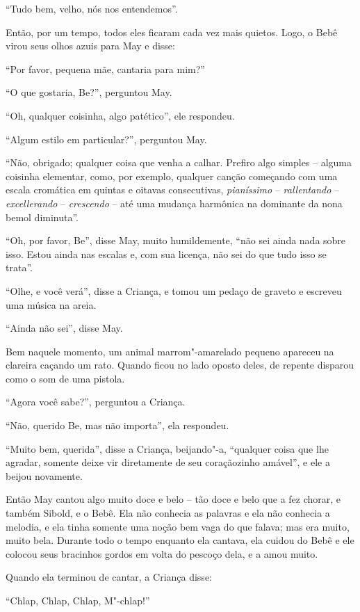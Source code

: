 ``Tudo bem, velho, nós nos entendemos''.

Então, por um tempo, todos eles ficaram cada vez mais quietos. Logo, o
Bebê virou seus olhos azuis para May e disse:

``Por favor, pequena mãe, cantaria para mim?''

``O que gostaria, Be?'', perguntou May.

``Oh, qualquer coisinha, algo patético'', ele respondeu.

``Algum estilo em particular?'', perguntou May.

``Não, obrigado; qualquer coisa que venha a calhar. Prefiro algo simples
-- alguma coisinha elementar, como, por exemplo, qualquer canção
começando com uma escala cromática em quintas e oitavas consecutivas,
\emph{pianíssimo} -- \emph{rallentando} -- \emph{excellerando} --
\emph{crescendo} -- até uma mudança harmônica na dominante da nona bemol
diminuta''.

``Oh, por favor, Be'', disse May, muito humildemente, ``não sei ainda
nada sobre isso. Estou ainda nas escalas e, com sua licença, não sei do
que tudo isso se trata''.

``Olhe, e você verá'', disse a Criança, e tomou um pedaço de graveto e
escreveu uma música na areia.

``Ainda não sei'', disse May.

Bem naquele momento, um animal marrom"-amarelado pequeno apareceu na
clareira caçando um rato. Quando ficou no lado oposto deles, de repente
disparou como o som de uma pistola.

``Agora você sabe?'', perguntou a Criança.

``Não, querido Be, mas não importa'', ela respondeu.

``Muito bem, querida'', disse a Criança, beijando"-a, ``qualquer coisa
que lhe agradar, somente deixe vir diretamente de seu coraçãozinho
amável'', e ele a beijou novamente.

Então May cantou algo muito doce e belo -- tão doce e belo que a fez
chorar, e também Sibold, e o Bebê. Ela não conhecia as palavras e ela
não conhecia a melodia, e ela tinha somente uma noção bem vaga do que
falava; mas era muito, muito bela. Durante todo o tempo enquanto ela
cantava, ela cuidou do Bebê e ele colocou seus bracinhos gordos em volta
do pescoço dela, e a amou muito.

Quando ela terminou de cantar, a Criança disse:

``Chlap, Chlap, Chlap, M"-chlap!''

